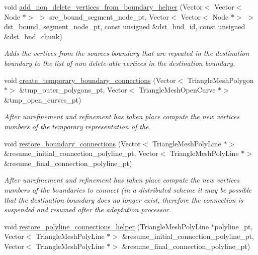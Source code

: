 \begin{DoxyCompactItemize}
void \hyperlink{classoomph_1_1RefineableTriangleMesh_a2d290418f7617412aebc3d66bcace8b1}{add\+\_\+non\+\_\+delete\+\_\+vertices\+\_\+from\+\_\+boundary\+\_\+helper} (Vector$<$ Vector$<$ Node $\ast$$>$ $>$ src\+\_\+bound\+\_\+segment\+\_\+node\+\_\+pt, Vector$<$ Vector$<$ Node $\ast$$>$ $>$ dst\+\_\+bound\+\_\+segment\+\_\+node\+\_\+pt, const unsigned \&dst\+\_\+bnd\+\_\+id, const unsigned \&dst\+\_\+bnd\+\_\+chunk)
\begin{DoxyCompactList}\small\item\em Adds the vertices from the sources boundary that are repeated in the destination boundary to the list of non delete-\/able vertices in the destination boundary. \end{DoxyCompactList}\item 
void \hyperlink{classoomph_1_1RefineableTriangleMesh_aa0d2608c4671777754eb84c5083c9fcb}{create\+\_\+temporary\+\_\+boundary\+\_\+connections} (Vector$<$ Triangle\+Mesh\+Polygon $\ast$$>$ \&tmp\+\_\+outer\+\_\+polygons\+\_\+pt, Vector$<$ Triangle\+Mesh\+Open\+Curve $\ast$$>$ \&tmp\+\_\+open\+\_\+curves\+\_\+pt)
\begin{DoxyCompactList}\small\item\em After unrefinement and refinement has taken place compute the new vertices numbers of the temporary representation of the. \end{DoxyCompactList}\item 
void \hyperlink{classoomph_1_1RefineableTriangleMesh_a844986a9cfbce009209f0e01ef5f5918}{restore\+\_\+boundary\+\_\+connections} (Vector$<$ Triangle\+Mesh\+Poly\+Line $\ast$$>$ \&resume\+\_\+initial\+\_\+connection\+\_\+polyline\+\_\+pt, Vector$<$ Triangle\+Mesh\+Poly\+Line $\ast$$>$ \&resume\+\_\+final\+\_\+connection\+\_\+polyline\+\_\+pt)
\begin{DoxyCompactList}\small\item\em After unrefinement and refinement has taken place compute the new vertices numbers of the boundaries to connect (in a distributed scheme it may be possible that the destination boundary does no longer exist, therefore the connection is suspended and resumed after the adaptation processor. \end{DoxyCompactList}\item 
void \hyperlink{classoomph_1_1RefineableTriangleMesh_ad88a1e3f1d31392623f348d8a4718a56}{restore\+\_\+polyline\+\_\+connections\+\_\+helper} (Triangle\+Mesh\+Poly\+Line $\ast$polyline\+\_\+pt, Vector$<$ Triangle\+Mesh\+Poly\+Line $\ast$$>$ \&resume\+\_\+initial\+\_\+connection\+\_\+polyline\+\_\+pt, Vector$<$ Triangle\+Mesh\+Poly\+Line $\ast$$>$ \&resume\+\_\+final\+\_\+connection\+\_\+polyline\+\_\+pt)

\end{DoxyCompactItemize}

